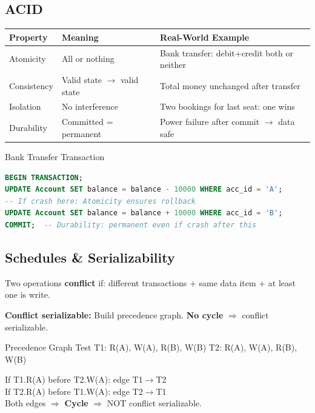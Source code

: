 \documentclass[12pt,a4paper]{article}
\begin{document}
\subsection{ACID}
\begin{center}
\begin{tabular}{@{}l p{4cm} p{5cm}@{}}
\toprule
\textbf{Property} & \textbf{Meaning} & \textbf{Real-World Example} \\
\midrule
Atomicity & All or nothing & Bank transfer: debit+credit both or neither \\
Consistency & Valid state $\to$ valid state & Total money unchanged after transfer \\
Isolation & No interference & Two bookings for last seat: one wins \\
Durability & Committed = permanent & Power failure after commit $\to$ data safe \\
\bottomrule
\end{tabular}
\end{center}

\begin{examplebox}{Bank Transfer Transaction}
\begin{lstlisting}[language=SQL]
BEGIN TRANSACTION;
UPDATE Account SET balance = balance - 10000 WHERE acc_id = 'A';
-- If crash here: Atomicity ensures rollback
UPDATE Account SET balance = balance + 10000 WHERE acc_id = 'B';
COMMIT;  -- Durability: permanent even if crash after this
\end{lstlisting}
\end{examplebox}

\subsection{Schedules \& Serializability}

Two operations \textbf{conflict} if: different transactions + same data item + at least one is write.

\textbf{Conflict serializable:} Build precedence graph. \textbf{No cycle} $\Rightarrow$ conflict serializable.

\begin{examplebox}{Precedence Graph Test}
T1: R(A), W(A), R(B), W(B) \quad T2: R(A), W(A), R(B), W(B)

If T1.R(A) before T2.W(A): edge T1$\to$T2\\
If T2.R(A) before T1.W(A): edge T2$\to$T1\\
Both edges $\Rightarrow$ \textbf{Cycle} $\Rightarrow$ NOT conflict serializable.
\end{examplebox}
\end{document}
